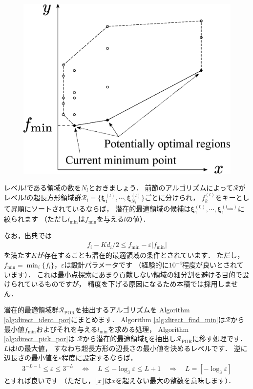 ﻿\documentclass{jsarticle}
\begin{document}
\begin{figure}[h]
\begin{center}
\includegraphics[height=.25\textheight]{fig/DIRECT_POR.eps}
\end{center}
\end{figure}

レベル$l$である領域の数を$N_{l}$とおきましょう．
前節のアルゴリズムによって$\mathcal{R}$が
レベル$l$の超長方形領域群$\mathcal{R}_{l}=\{\bm{\xi}^{(l)}_{1},\cdots,\bm{\xi}^{(l)}_{N_{l}}\}$ごとに分けられ，
$f^{(l)}_{k}$をキーとして昇順にソートされているならば，
潜在的最適領域の候補は$\bm{\xi}^{(0)}_{1},\cdots,\bm{\xi}^{(l_{\mathrm{min}})}_{1}$に絞られます
（ただし$l_{\mathrm{min}}$は$f_{\mathrm{min}}$を与える$l$の値）．

なお，出典では
\begin{align*}
f_{i}-K d_{i}/2 \leq f_{\mathrm{min}}-\varepsilon\left|f_{\mathrm{min}}\right|
\end{align*}
を満たす$K$が存在することも潜在的最適領域の条件とされています．
ただし，$f_{\mathrm{min}}=\min_{i}\{f_{i}\}$，$\varepsilon$は設計パラメータです
（経験的に$10^{-4}$程度が良いとされています）．
これは最小点探索にあまり貢献しない領域の細分割を避ける目的で設けられているものですが，
精度を下げる原因になるため本稿では採用しません．

潜在的最適領域群$\mathcal{R}_{\mathrm{POR}}$を抽出するアルゴリズムを
Algorithm \ref{alg:direct_ident_por}にまとめます．
Algorithm \ref{alg:direct_find_min}は$\mathcal{R}$から最小値$f_{\mathrm{min}}$およびそれを与える$l_{\mathrm{min}}$を求める処理，
Algorithm \ref{alg:direct_pick_por}は
$\mathcal{R}$から潜在的最適領域$\bm{\xi}$を抽出し$\mathcal{R}_{\mathrm{POR}}$に移す処理です．
$L$は$l$の最大値，
すなわち超長方形の辺長さの最小値を決めるレベルです．
逆に辺長さの最小値を$\varepsilon$程度に設定するならば，
\begin{align*}
3^{-L-1}\leq \varepsilon\leq 3^{-L}
\quad\Leftrightarrow\quad
L\leq -\log_{3}\varepsilon\leq L+1
\quad\Rightarrow\quad
L=\left[-\log_{3}\varepsilon\right]
\end{align*}
とすれば良いです
（ただし，$\lfloor x \rfloor$は$x$を超えない最大の整数を意味します）．
\end{document}

